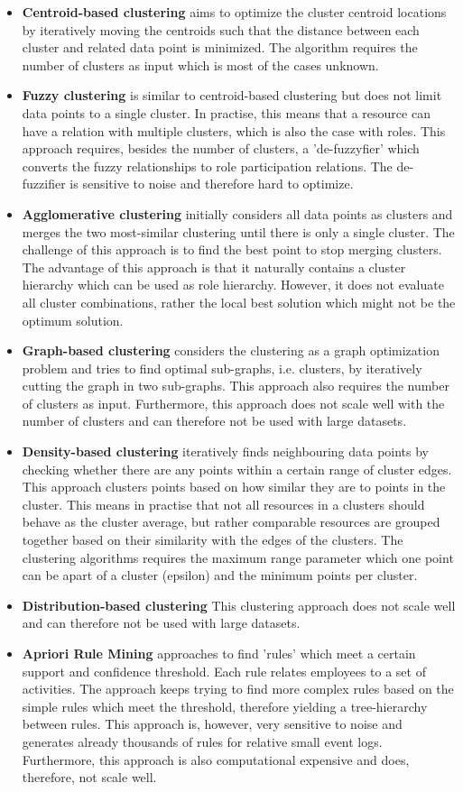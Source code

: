 \begin{itemize}
\item \textbf{Centroid-based clustering} aims to optimize the cluster centroid locations by iteratively moving the centroids such that the distance between each cluster and related data point is minimized. The algorithm requires the number of clusters as input which is most of the cases unknown.  
\item \textbf{Fuzzy clustering} is similar to centroid-based clustering but does not limit data points to a single cluster. In practise, this means that a resource can have a relation with multiple clusters, which is also the case with roles. This approach  requires, besides the number of clusters, a 'de-fuzzyfier' which converts the fuzzy relationships to role participation relations. The de-fuzzifier is sensitive to noise and therefore hard to optimize.  
\item \textbf{Agglomerative clustering} initially considers all data points as clusters and merges the two most-similar clustering until there is only a single cluster. The challenge of this approach is to find the best point to stop merging clusters. The advantage of this approach is that it naturally contains a cluster hierarchy which can be used as role hierarchy. However, it does not evaluate all cluster combinations, rather the local best solution which might not be the optimum solution. 
\item \textbf{Graph-based clustering} considers the clustering as a graph optimization problem and tries to find optimal sub-graphs, i.e. clusters, by iteratively cutting the graph in two sub-graphs. This approach also requires the number of clusters as input. Furthermore, this approach does not scale well with the number of clusters and can therefore not be used with large datasets. 
\item \textbf{Density-based clustering} iteratively finds neighbouring data points by checking whether there are any points within a certain range of cluster edges. This approach clusters points based on how similar they are to points in the cluster. This means in practise that not all resources in a clusters should behave as the cluster average, but rather comparable resources are grouped together based on their similarity with the edges of the clusters. The clustering algorithms requires the maximum range parameter which one point can be apart of a cluster (epsilon) and the minimum points per cluster.  
\item \textbf{Distribution-based clustering} This clustering approach does not scale well and can therefore not be used with large datasets. 
\item \textbf{Apriori Rule Mining} approaches to find 'rules' which meet a certain support and confidence threshold. Each rule relates employees to a set of activities. The approach keeps trying to find more complex rules based on the simple rules which meet the threshold, therefore yielding a tree-hierarchy between rules. This approach is, however, very sensitive to noise and generates already thousands of rules for relative small event logs. Furthermore, this approach is also computational expensive and does, therefore, not scale well. 
\end{itemize}
